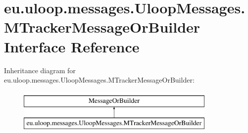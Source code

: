 \hypertarget{interfaceeu_1_1uloop_1_1messages_1_1UloopMessages_1_1MTrackerMessageOrBuilder}{\section{eu.\+uloop.\+messages.\+Uloop\+Messages.\+M\+Tracker\+Message\+Or\+Builder Interface Reference}
\label{interfaceeu_1_1uloop_1_1messages_1_1UloopMessages_1_1MTrackerMessageOrBuilder}
}
Inheritance diagram for eu.\+uloop.\+messages.\+Uloop\+Messages.\+M\+Tracker\+Message\+Or\+Builder\+:\begin{figure}[H]
\begin{center}
\leavevmode
\includegraphics[height=2.000000cm]{interfaceeu_1_1uloop_1_1messages_1_1UloopMessages_1_1MTrackerMessageOrBuilder}
\end{center}
\end{figure}
